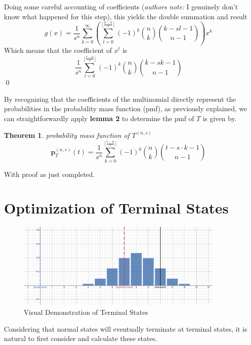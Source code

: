 \documentclass[a4paper]{article}
\newtheorem{theorem}{Theorem}
\renewenvironment{proof}{{\bfseries Proof}}{\qed}
\begin{document}
\begin{proof}
    Doing some careful accounting of coefficients (\textit{authors note:} I genuinely don't know what happened for this step), this yields the double summation and result
    $$
    g(x) = \frac{1}{s^n} \sum_{k = 0}^{\infty} \left(\sum_{l = 0}^{\lfloor\frac{k-n}{s} \rfloor} (-1)^k \binom{n}{k} \binom{k-sl-1}{n-1} \right) x^k
    $$
    Which means that the coefficient of $x^t$ is 
    $$
    \frac{1}{s^n} \sum_{l = 0}^{\lfloor\frac{t-n}{s} \rfloor} (-1)^k \binom{n}{k} \binom{k-sk-1}{n-1}
    $$ 
\end{proof}


By recognizing that the coefficients of the multinomial directly represent the probabilities in the probability mass function (pmf), as previously explained, we can straightforwardly apply \textbf{lemma 2} to determine the pmf of $T$ is given by.
%
\begin{theorem}{probability mass function of $T^{(n, s)}$}
    $$
    \textbf{p}_{T}^{(n, s)}(t) = \frac{1}{s^n} \sum_{k = 0}^{\lfloor\frac{t-n}{s} \rfloor} (-1)^k \binom{n}{k} \binom{t - s \cdot k - 1}{n-1}
    $$
\end{theorem}

With proof as just completed.


\section{Optimization of Terminal States}

\begin{figure}[h]
    \centering
    \includegraphics[width=0.9\textwidth]{Screenshot 2023-12-09 at 21.07.12.png}
    \caption{Visual Demonstration of Terminal States}
\end{figure}

Considering that normal states will eventually terminate at terminal states, it is natural to first consider and calculate these states.
\end{document}
